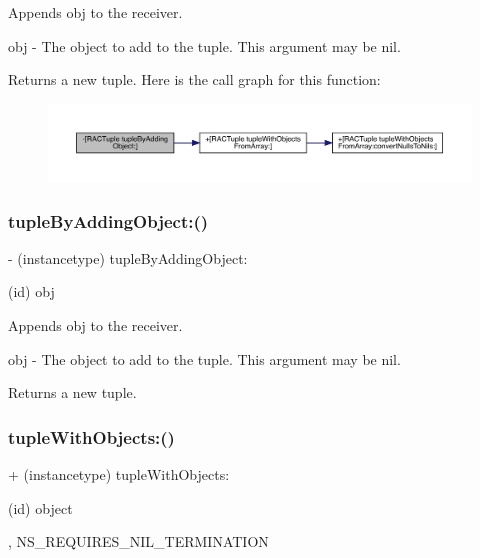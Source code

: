 Appends {\ttfamily obj} to the receiver.

obj -\/ The object to add to the tuple. This argument may be nil.

Returns a new tuple. Here is the call graph for this function\+:\nopagebreak
\begin{figure}[H]
\begin{center}
\leavevmode
\includegraphics[width=350pt]{interface_r_a_c_tuple_a9ad29985f13aa286f5923ca4c98d30a5_cgraph}
\end{center}
\end{figure}
\mbox{\label{interface_r_a_c_tuple_a9ad29985f13aa286f5923ca4c98d30a5}} 
\subsubsection{\texorpdfstring{tuple\+By\+Adding\+Object\+:()}{tupleByAddingObject:()}\hspace{0.1cm}{\footnotesize\ttfamily [3/3]}}
{\footnotesize\ttfamily -\/ (instancetype) tuple\+By\+Adding\+Object\+: \begin{DoxyParamCaption}\item[{(id)}]{obj }\end{DoxyParamCaption}}

Appends {\ttfamily obj} to the receiver.

obj -\/ The object to add to the tuple. This argument may be nil.

Returns a new tuple. \mbox{\label{interface_r_a_c_tuple_aee3e51cf62b2f6f2c12607117a01f5ae}} 
\subsubsection{\texorpdfstring{tuple\+With\+Objects\+:()}{tupleWithObjects:()}\hspace{0.1cm}{\footnotesize\ttfamily [1/3]}}
{\footnotesize\ttfamily + (instancetype) tuple\+With\+Objects\+: \begin{DoxyParamCaption}\item[{(id)}]{object }\item[{,}]{N\+S\+\_\+\+R\+E\+Q\+U\+I\+R\+E\+S\+\_\+\+N\+I\+L\+\_\+\+T\+E\+R\+M\+I\+N\+A\+T\+I\+ON }\end{DoxyParamCaption}}

